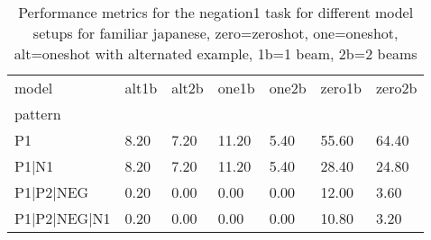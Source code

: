 \begin{table}[h]
\begin{tabular}{l|llllll}
\toprule
model & alt1b & alt2b & one1b & one2b & zero1b & zero2b \\
pattern &  &  &  &  &  &  \\
\midrule
P1 & 8.20 & 7.20 & 11.20 & 5.40 & 55.60 & 64.40 \\
P1|N1 & 8.20 & 7.20 & 11.20 & 5.40 & 28.40 & 24.80 \\
P1|P2|NEG & 0.20 & 0.00 & 0.00 & 0.00 & 12.00 & 3.60 \\
P1|P2|NEG|N1 & 0.20 & 0.00 & 0.00 & 0.00 & 10.80 & 3.20 \\
\bottomrule
\end{tabular}
\caption{Performance metrics for the negation1 task for different model setups for familiar japanese, zero=zeroshot, one=oneshot, alt=oneshot with alternated example, 1b=1 beam, 2b=2 beams}
\label{tab:ja fam_negation1_performance}
\end{table}
